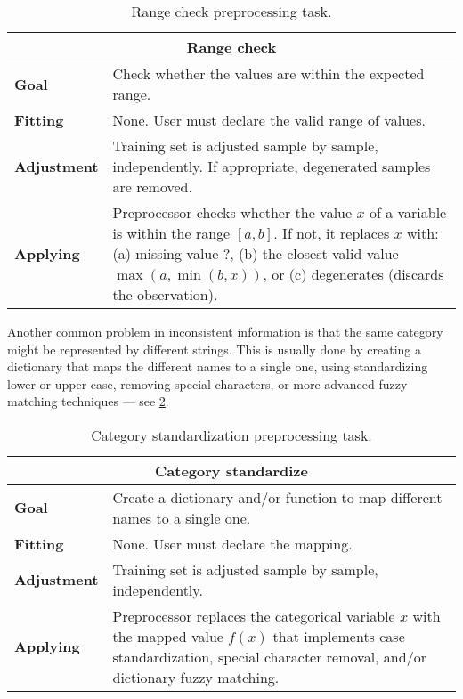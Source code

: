 \begin{table}\caption{Range check preprocessing task.}
  \centering
  \begin{tabular}{lp{6cm}}
    \toprule
    \multicolumn{2}{c}{\textbf{Range check}} \\
    \midrule
    \textbf{Goal} &
      Check whether the values are within the expected range. \\
    \textbf{Fitting} &
      None. User must declare the valid range of values. \\
    \textbf{Adjustment} &
      Training set is adjusted sample by sample, independently.  If appropriate,
      degenerated samples are removed. \\
    \textbf{Applying} &
      Preprocessor checks whether the value $x$ of a variable is within the range $[a,
      b]$.  If not, it replaces $x$ with: (a) missing value $?$, (b) the closest valid
      value $\max(a, \min(b, x))$, or (c) degenerates (discards the observation). \\
    \bottomrule
  \end{tabular}
  \label{tab:range-check}
\end{table}

Another common problem in inconsistent information is that the same category might be
represented by different strings.  This is usually done by creating a dictionary that maps
the different names to a single one, using standardizing lower or upper case, removing
special characters, or more advanced fuzzy matching techniques --- see
\cref{tab:text-standardization}.

\begin{table}\caption{Category standardization preprocessing task.}
  \centering
  \begin{tabular}{lp{6cm}}
    \toprule
    \multicolumn{2}{c}{\textbf{Category standardize}} \\
    \midrule
    \textbf{Goal} &
      Create a dictionary and/or function to map different names to a single one. \\
    \textbf{Fitting} &
      None. User must declare the mapping. \\
    \textbf{Adjustment} &
      Training set is adjusted sample by sample, independently. \\
    \textbf{Applying} &
      Preprocessor replaces the categorical variable $x$ with the mapped
      value $f(x)$ that implements case standardization, special character removal, and/or
      dictionary fuzzy matching. \\
    \bottomrule
  \end{tabular}
  \label{tab:text-standardization}
\end{table}

